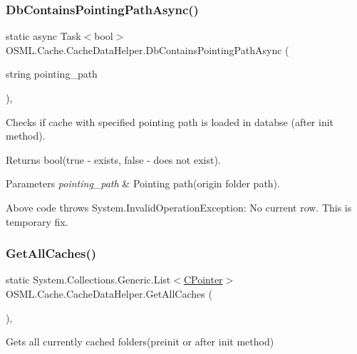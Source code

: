 \subsubsection{\texorpdfstring{DbContainsPointingPathAsync()}{DbContainsPointingPathAsync()}}
{\footnotesize\ttfamily static async Task$<$bool$>$ O\+S\+M\+L.\+Cache.\+Cache\+Data\+Helper.\+Db\+Contains\+Pointing\+Path\+Async (\begin{DoxyParamCaption}\item[{string}]{pointing\+\_\+path }\end{DoxyParamCaption})\hspace{0.3cm}{\ttfamily [inline]}, {\ttfamily [static]}}



Checks if cache with specified pointing path is loaded in databse (after init method). 

\begin{DoxyReturn}{Returns}
bool(true -\/ exists, false -\/ does not exist). 
\end{DoxyReturn}

\begin{DoxyParams}{Parameters}
{\em pointing\+\_\+path} & Pointing path(origin folder path).\\
\hline
\end{DoxyParams}
Above code throws System.\+Invalid\+Operation\+Exception\+: No current row. This is temporary fix. \mbox{\label{classOSML_1_1Cache_1_1CacheDataHelper_af88f60164b288507fbd0b457d23271ce}} 
\subsubsection{\texorpdfstring{GetAllCaches()}{GetAllCaches()}}
{\footnotesize\ttfamily static System.\+Collections.\+Generic.\+List$<$\mbox{\hyperlink{classOSML_1_1Cache_1_1CPointer}{C\+Pointer}}$>$ O\+S\+M\+L.\+Cache.\+Cache\+Data\+Helper.\+Get\+All\+Caches (\begin{DoxyParamCaption}{ }\end{DoxyParamCaption})\hspace{0.3cm}{\ttfamily [inline]}, {\ttfamily [static]}}



Gets all currently cached folders(preinit or after init method) 

